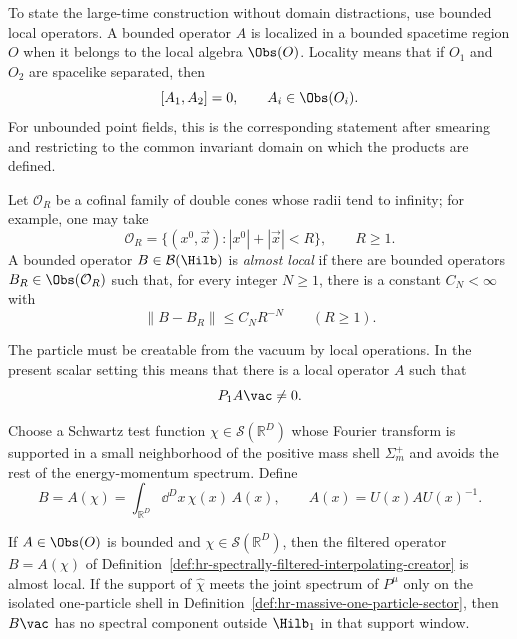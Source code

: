 To state the large-time construction without domain distractions, use bounded
local operators. A bounded operator \(A\) is localized in a bounded spacetime
region \(O\) when it belongs to the local algebra \(\Obs(O)\). Locality means
that if \(O_1\) and \(O_2\) are spacelike separated, then
\[
  [A_1,A_2]=0,
  \qquad
  A_i\in\Obs(O_i).
\]
For unbounded point fields, this is the corresponding statement after
smearing and restricting to the common invariant domain on which the products
are defined.

\begin{definition}
\label{def:almost-local-bounded-operator}
Let \(\mathcal O_R\) be a cofinal family of double cones whose radii tend to
infinity; for example, one may take
\[
  \mathcal O_R=\{(x^0,\vec x): |x^0|+|\vec x|<R\},
  \qquad R\ge1 .
\]
A bounded operator \(B\in\mathcal B(\Hilb)\) is \emph{almost local} if there
are bounded operators \(B_R\in\Obs(\mathcal O_R)\) such that, for every integer
\(N\ge1\), there is a constant \(C_N<\infty\) with
\[
  \|B-B_R\|\le C_N R^{-N}
  \qquad (R\ge1).
\]
\end{definition}

The particle must be creatable from the vacuum by local operations. In the
present scalar setting this means that there is a local operator \(A\) such
that
\[
  P_1A\vac\ne0 .
\]

\begin{definition}
\label{def:hr-spectrally-filtered-interpolating-creator}
Choose a Schwartz test function \(\chi\in\mathcal S(\mathbb R^D)\) whose
Fourier transform is supported in a small neighborhood of the positive mass
shell \(\Sigma_m^+\) and avoids the rest of the energy-momentum spectrum.
Define
\[
  B=A(\chi)
  =
  \int_{\mathbb R^D}\dd^D x\,\chi(x)\,A(x),
  \qquad
  A(x)=U(x)AU(x)^{-1}.
\]
\end{definition}

\begin{proposition}
\label{prop:hr-filtered-local-creators-almost-local}
If \(A\in\Obs(O)\) is bounded and \(\chi\in\mathcal S(\mathbb R^D)\), then
the filtered operator \(B=A(\chi)\) of
Definition~\ref{def:hr-spectrally-filtered-interpolating-creator} is almost
local.  If the support of \(\widehat\chi\) meets the joint spectrum of
\(P^\mu\) only on the isolated one-particle shell in
Definition~\ref{def:hr-massive-one-particle-sector}, then \(B\vac\) has no
spectral component outside \(\Hilb_1\) in that support window.
\end{proposition}

